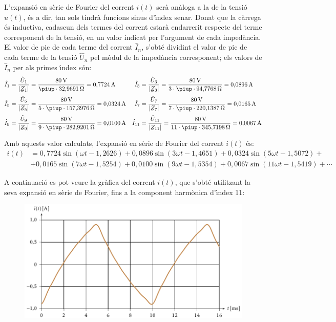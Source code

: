 \begin{exemple}
L'expansi\'{o} en s\`{e}rie de Fourier del corrent $i(t)$ ser\`{a} an\`{a}loga a la
de la tensi\'{o} $u(t)$, \'{e}s a dir, tan sols tindr\`{a} funcions sinus
d'\'{\i}ndex senar. Donat que la c\`{a}rrega \'{e}s inductiva, cadascun dels
termes del corrent estar\`{a} endarrerit respecte del terme corresponent
de la tensi\'{o}, en un valor indicat per l'argument de cada imped\`{a}ncia.
El valor de pic de cada terme del corrent $\hat{I}_n$, s'obt\'{e}
dividint el valor de pic de cada terme de la tensi\'{o} $\hat{U}_n$ pel
m\`{o}dul de la imped\`{a}ncia corresponent; els valors de $\hat{I}_n$ per
als primes \'{\i}ndex s\'{o}n:
\begin{align*}
    \hat{I}_1 &= \frac{\hat{U}_1}{|\cmplx{Z}_1|} = \frac{80\unit{V}}{\piup\cdot32{,}9691\unit{\ohm}} = 0{,}7724\unit{A}
    & \hat{I}_3 &= \frac{\hat{U}_3}{|\cmplx{Z}_3|} =\frac{80\unit{V}}{3\cdot\piup\cdot 94{,}7768\unit{\ohm}} = 0{,}0896\unit{A}\\[0.5ex]
    \hat{I}_5 &= \frac{\hat{U}_5}{|\cmplx{Z}_5|} =\frac{80\unit{V}}{5\cdot\piup\cdot 157{,}3976\unit{\ohm}} =0{,}0324\unit{A}
    & \hat{I}_7 &= \frac{\hat{U}_7}{|\cmplx{Z}_7|} =\frac{80\unit{V}}{7\cdot\piup\cdot 220{,}1387\unit{\ohm}} =
    0{,}0165\unit{A}\\[0.5ex]
    \hat{I}_9 &= \frac{\hat{U}_9}{|\cmplx{Z}_9|} =\frac{80\unit{V}}{9\cdot\piup\cdot 282{,}9201\unit{\ohm}} =
    0{,}0100\unit{A} & \hat{I}_{11} &= \frac{\hat{U}_{11}}{|\cmplx{Z}_{11}|} =\frac{80\unit{V}}
    {11\cdot\piup\cdot 345{,}7198\unit{\ohm}} =  0{,}0067\unit{A}
\end{align*}

Amb aquests valor calculats, l'expansi\'{o} en s\`{e}rie de Fourier del
corrent $i(t)$ \'{e}s:
\[\begin{split}
     i(t) &=  0{,}7724 \sin(\omega t - 1{,}2626) +  0{,}0896 \sin(3 \omega t -
     1{,}4651) + 0{,}0324 \sin(5 \omega t - 1{,}5072) +{}\\
     &+ 0{,}0165 \sin(7 \omega t - 1{,}5254) + 0{,}0100 \sin(9 \omega t - 1{,}5354)
     +0{,}0067 \sin(11 \omega t - 1{,}5419) +\cdots
\end{split}\]

A continuaci\'{o} es pot veure la gr\`{a}fica del corrent $i(t)$, que s'obt\'{e}
utilitzant la seva expansi\'{o} en s\`{e}rie de Fourier, fins a la component
harm\`{o}nica d'\'{\i}ndex 11:

\begin{figure}[h]
\centering
  \includegraphics{Imatges/Cap-Fourier-Exemple-Corrent.pdf}
\end{figure}


\end{exemple}
